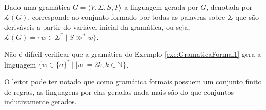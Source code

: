 \begin{definition}\label{def:LinaugemGramatica}
	Dado uma gramática $G = \langle V, \Sigma, S, P \rangle$ a linguagem gerada por $G$, denotada por $\mathcal{L}(G)$, corresponde ao conjunto formado por todas as palavras sobre $\Sigma$ que são deriváveis a partir do variável inicial da gramática, ou seja, $\mathcal{L}(G) = \{w \in \Sigma^* \mid S \gg^* w\}$.
\end{definition}

\begin{example}
	Não é difícil verificar que a gramática do Exemplo \ref{exe:GramaticaFormal1} gera a linguagem $\{w \in \{a\}^* \mid |w| = 2k, k \in \mathbb{N}\}$.
\end{example}

O leitor pode ter notado que como gramática formais possuem um conjunto finito de regras, as linguagens por elas geradas nada mais são do que conjuntos indutivamente gerados.